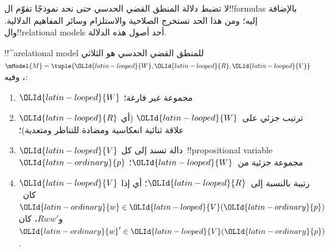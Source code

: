 \documentclass[../../../include/open-logic-section]{subfiles}
\begin{document}


لا تضبط دلالة المنطق القضي الحدسي حتى نحد نموذجًا تقوّم ال!!{formula}s
بالإضافة إليه؛ ومن هذا الحد تستخرج الصلاحية والاستلزام وسائر المفاهيم
الدلالية. وال!!{relational model}s أحد أصول هذه الدلالة.

\begin{defn}
  !!^a{relational model} للمنطق القضي الحدسي هو الثلاثي
  $\mModel{M}=\tuple{\OLId{latin-looped}{W},\OLId{latin-looped}{R},\OLId{latin-looped}{V}}$، وفيه:
  \begin{enumerate}
  \item $\OLId{latin-looped}{W}$ مجموعة غير فارغة؛
  \item $\OLId{latin-looped}{R}$ ترتيب جزئي على~$\OLId{latin-looped}{W}$ (أي علاقة ثنائية انعكاسية ومضادة للتناظر
    ومتعدية)؛
  \item $\OLId{latin-looped}{V}$ دالة تسند إلى كل~!!{propositional
    variable}~$\OLId{latin-ordinary}{p}$ مجموعة جزئية من~$\OLId{latin-looped}{W}$؛
  \item $\OLId{latin-looped}{V}$ رتيبة بالنسبة إلى~$\OLId{latin-looped}{R}$؛ أي إذا كان~$\OLId{latin-ordinary}{w} \in \OLId{latin-looped}{V}(\OLId{latin-ordinary}{p})$ و$Rww'$،
    كان~$\OLId{latin-ordinary}{w}' \in \OLId{latin-looped}{V}(\OLId{latin-ordinary}{p})$.
  \end{enumerate}
\end{defn}
\end{document}
